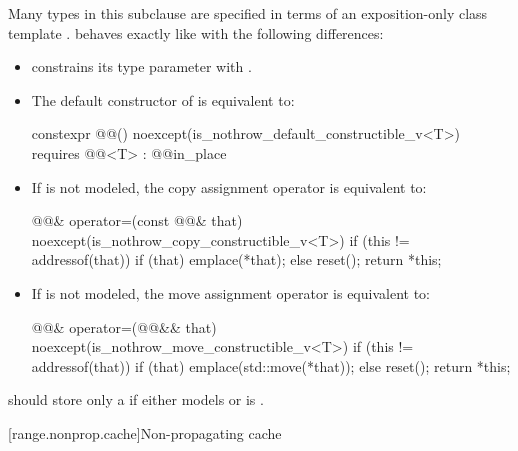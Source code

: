 \pnum
Many types in this subclause are specified in terms of
an exposition-only class template .
 behaves exactly like 
with the following differences:
\begin{itemize}
\item {} constrains
its type parameter  with
.

\item The default
constructor of  is equivalent to:
\begin{codeblock}
constexpr @@() noexcept(is_nothrow_default_constructible_v<T>)
    requires @@<T>
  : @@{in_place}
{ }
\end{codeblock}

\item If  is not
modeled, the copy assignment operator is equivalent to:
\begin{codeblock}
@@& operator=(const @@& that)
  noexcept(is_nothrow_copy_constructible_v<T>) {
  if (this != addressof(that)) {
    if (that) emplace(*that);
    else reset();
  }
  return *this;
}
\end{codeblock}

\item If  is not modeled,
the move assignment operator is equivalent to:
\begin{codeblock}
@@& operator=(@@&& that)
  noexcept(is_nothrow_move_constructible_v<T>) {
  if (this != addressof(that)) {
    if (that) emplace(std::move(*that));
    else reset();
  }
  return *this;
}
\end{codeblock}
\end{itemize}

\pnum
\recommended
{} should store only a 
if either  models  or
is .

[range.nonprop.cache]{Non-propagating cache}

